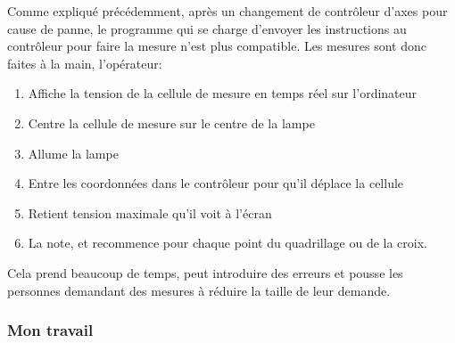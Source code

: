 \documentclass[12pt]{article}
\begin{document}
Comme expliqué précédemment, après un changement de contrôleur d'axes pour cause de panne, le programme qui se charge d'envoyer les instructions au contrôleur pour faire la mesure n'est plus compatible.
Les mesures sont donc faites à la main, l'opérateur:
\begin{enumerate}
		\label{etapesMesureBancXY}

	\item Affiche la tension de la cellule de mesure en temps réel sur l'ordinateur
	\item Centre la cellule de mesure sur le centre de la lampe
	\item Allume la lampe
	\item Entre les coordonnées dans le contrôleur pour qu'il déplace la cellule
	\item Retient tension maximale qu'il voit à l'écran
	\item La note, et recommence pour chaque point du quadrillage ou de la croix.
\end{enumerate}
Cela prend beaucoup de temps, peut introduire des erreurs et pousse les personnes demandant des mesures à réduire la taille de leur demande.

\subsubsection{Mon travail}
\end{document}
